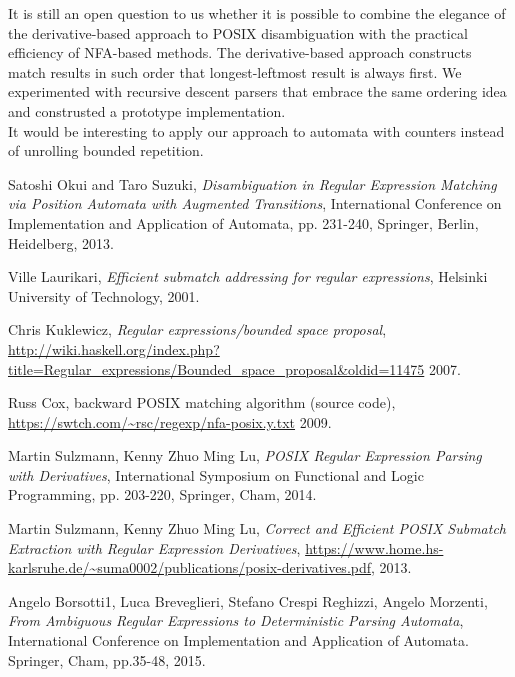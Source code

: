 \documentclass[AMA,STIX1COL]{WileyNJD-v2}
\begin{document}
It is still an open question to us
whether it is possible to combine the elegance of the derivative-based approach to POSIX disambiguation
with the practical efficiency of NFA-based methods.
%
The derivative-based approach constructs match results in such order that longest-leftmost result is always first.
%
We experimented with recursive descent parsers that embrace the same ordering idea
and construsted a prototype implementation.
\\

It would be interesting to apply our approach to automata with counters
instead of unrolling bounded repetition.


\begin{thebibliography}{99}

    Satoshi Okui and Taro Suzuki,
    \textit{Disambiguation in Regular Expression Matching via Position Automata with Augmented Transitions},
    International Conference on Implementation and Application of Automata, pp. 231-240, Springer, Berlin, Heidelberg,
    2013.

    Ville Laurikari,
    \textit{Efficient submatch addressing for regular expressions},
    Helsinki University of Technology,
    2001.

    Chris Kuklewicz,
    \textit{Regular expressions/bounded space proposal},
    \url{http://wiki.haskell.org/index.php?title=Regular_expressions/Bounded_space_proposal&oldid=11475}
    2007.

    Russ Cox,
    backward POSIX matching algorithm (source code),
    \url{https://swtch.com/~rsc/regexp/nfa-posix.y.txt}
    2009.

    Martin Sulzmann, Kenny Zhuo Ming Lu,
    \textit{POSIX Regular Expression Parsing with Derivatives},
    International Symposium on Functional and Logic Programming, pp. 203-220, Springer, Cham,
    2014.

    Martin Sulzmann, Kenny Zhuo Ming Lu,
    \textit{Correct and Efficient POSIX Submatch Extraction with Regular Expression Derivatives},
    \url{https://www.home.hs-karlsruhe.de/~suma0002/publications/posix-derivatives.pdf},
    2013.

    Angelo Borsotti1, Luca Breveglieri, Stefano Crespi Reghizzi, Angelo Morzenti,
    \textit{From Ambiguous Regular Expressions to Deterministic Parsing Automata},
    International Conference on Implementation and Application of Automata. Springer, Cham, pp.35-48,
    2015.


\end{thebibliography}
\end{document}
